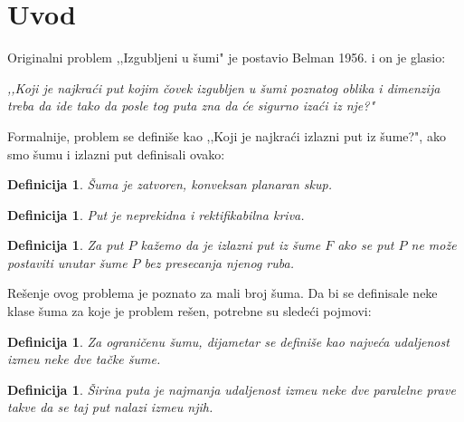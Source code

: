 \documentclass[11pt,letter]{article}
\newtheorem{df}[teo]{\bf Definicija}
\begin{document}
\section[Uvod]{Uvod}

\bigskip
Originalni problem ,,Izgubljeni u \v sumi" je postavio Belman 1956.  \cite{Bellman} i on je glasio:
\begin{center}
\textit{,,Koji je najkra\' ci put kojim \v covek izgubljen u \v sumi poznatog oblika i dimenzija treba da ide tako da posle tog puta zna da \' ce sigurno iza\' ci iz nje?"}
\end{center}

\indent Formalnije, problem se defini\v se kao ,,Koji je najkra\' ci izlazni put iz \v sume?", ako smo \v sumu i izlazni put definisali ovako:
\begin{df} \v Suma je zatvoren, konveksan planaran skup. \end{df}
\begin{df} Put je neprekidna i rektifikabilna kriva.\end{df}
\begin{df} Za put $P$ ka\v zemo da je izlazni put iz \v sume $F$ ako se put $P$ ne mo\v ze postaviti unutar \v sume $P$ bez presecanja njenog ruba.  \end{df}
\bigskip
Re\v senje ovog problema je poznato za mali broj \v suma. Da bi se definisale neke klase \v suma za koje je problem re\v sen, potrebne su slede\' ci pojmovi:
\begin{df} Za ograni\v cenu \v sumu, dijametar se defini\v se kao najve\' ca udaljenost izme\dj u neke dve ta\v cke \v sume.\end{df}
\begin{df} \v Sirina puta je najmanja udaljenost izme\dj u neke dve paralelne prave takve da se taj put nalazi izme\dj u njih. \end{df}
\end{document}
